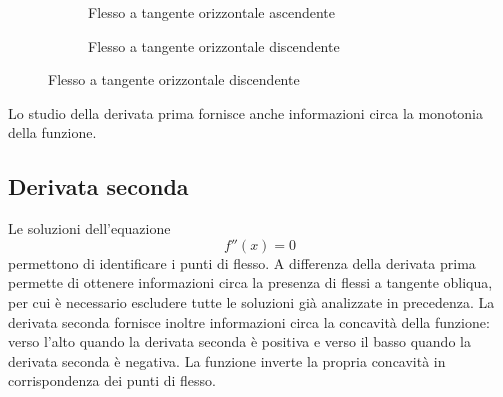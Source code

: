 \documentclass{article}     %
\begin{document}
\begin{figure}[h!]
\begin{subfigure}{0.48\textwidth}
            \caption{Flesso a tangente orizzontale ascendente}
        \end{subfigure}
        \begin{subfigure}{0.48\textwidth}
            \centering
            \caption{Flesso a tangente orizzontale discendente}
        \end{subfigure}
    \end{figure}
    Lo studio della derivata prima fornisce anche informazioni circa la monotonia della funzione.
    \subsection{Derivata seconda}
    Le soluzioni dell'equazione \[f''(x)=0\] permettono di identificare i punti di flesso. A differenza della derivata prima permette di ottenere informazioni circa la presenza di flessi a tangente obliqua, per cui è necessario escludere tutte le soluzioni già analizzate in precedenza. 
    La derivata seconda fornisce inoltre informazioni circa la concavità della funzione: verso l'alto quando la derivata seconda è positiva e verso il basso quando la derivata seconda è negativa. La funzione inverte la propria concavità in corrispondenza dei punti di flesso.
\end{document}

